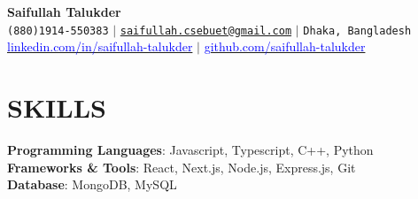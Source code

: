 \documentclass[letterpaper,10pt]{article}
\begin{document}
\begin{center}
    \textbf{\Huge Saifullah Talukder} \\ \vspace{5pt}
    \small \faPhone* \texttt{(880)1914-550383} \hspace{1pt} $|$
    \hspace{1pt} \faEnvelope \hspace{2pt} \texttt{\href{mailto:saifullah.cse16.buet@gmail.com}{saifullah.csebuet@gmail.com}} \hspace{1pt} $|$ 
    \hspace{1pt} \faMapMarker* \hspace{2pt}\texttt{Dhaka, Bangladesh}
    \\ \vspace{5pt}
    \hspace{1pt} \faLinkedin \hspace{2pt} \href{https://www.linkedin.com/in/saifullah-talukder}{\textcolor{blue}{linkedin.com/in/saifullah-talukder}} \hspace{1pt} $|$
    \hspace{1pt} \faGithub \hspace{2pt} \href{https://github.com/saifullah-talukder}{\textcolor{blue}{github.com/saifullah-talukder}} \hspace{1pt} %
    \\ \vspace{-5pt}
\end{center}

\section{SKILLS}
 \begin{itemize}[leftmargin=0in, label={}]
    \small{\item{
     \textbf{Programming Languages}: \hspace{1pt} {Javascript, Typescript, C++, Python}\vspace{2pt} \\
     \textbf{Frameworks \& Tools}: \hspace{22pt} {React, Next.js, Node.js, Express.js, Git}\vspace{2pt} \\
     \textbf{Database}: \hspace{69pt} {MongoDB, MySQL}
    }}
 \end{itemize}
\end{document}
